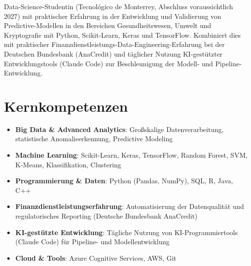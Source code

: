 \documentclass[11pt,a4paper,sans]{moderncv}
\begin{document}
\makecvtitle


\vspace{6pt}
\small{Data-Science-Studentin (Tecnológico de Monterrey, Abschluss voraussichtlich 2027) mit praktischer Erfahrung in der Entwicklung und Validierung von Predictive-Modellen in den Bereichen Gesundheitswesen, Umwelt und Kryptografie mit Python, Scikit-Learn, Keras und TensorFlow. Kombiniert dies mit praktischer Finanzdienstleistungs-Data-Engineering-Erfahrung bei der Deutschen Bundesbank (AnaCredit) und täglicher Nutzung KI-gestützter Entwicklungstools (Claude Code) zur Beschleunigung der Modell- und Pipeline-Entwicklung.}


\section{Kernkompetenzen}
\vspace{1pt}
\begin{itemize}

\item \textbf{Big Data \& Advanced Analytics}: Großskalige Datenverarbeitung, statistische Anomalieerkennung, Predictive Modeling

\item \textbf{Machine Learning}: Scikit-Learn, Keras, TensorFlow, Random Forest, SVM, K-Means, Klassifikation, Clustering

\item \textbf{Programmierung \& Daten}: Python (Pandas, NumPy), SQL, R, Java, C++

\item \textbf{Finanzdienstleistungserfahrung}: Automatisierung der Datenqualität und regulatorisches Reporting (Deutsche Bundesbank AnaCredit)

\item \textbf{KI-gestützte Entwicklung}: Tägliche Nutzung von KI-Programmiertools (Claude Code) für Pipeline- und Modellentwicklung

\item \textbf{Cloud \& Tools}: Azure Cognitive Services, AWS, Git

\end{itemize}
\end{document}
